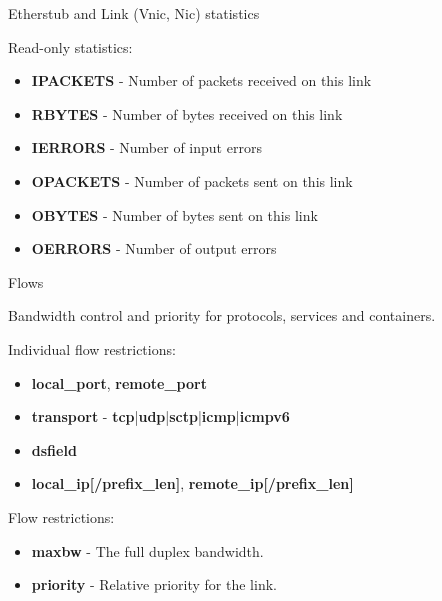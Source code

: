 \documentclass{beamer}
\begin{document}
		\begin{frame}{Etherstub and Link (Vnic, Nic) statistics }

			Read-only statistics:
			
			\begin{itemize}

				\item \textbf{IPACKETS} - Number of packets received on this link
				\item \textbf{RBYTES} - Number of bytes received on this link
				\item \textbf{IERRORS} - Number of input errors
				\item \textbf{OPACKETS} - Number of packets sent on this link
				\item \textbf{OBYTES} - Number of bytes sent on this link
				\item \textbf{OERRORS} - Number of output errors
			
			\end{itemize}

		\end{frame}


		\begin{frame}{Flows}

			Bandwidth control and priority for protocols, services and containers.

			\medskip

			Individual flow restrictions:

			\begin{itemize}
				\item \textbf{local\_port}, \textbf{remote\_port}
				\item \textbf{transport} - \textbf{tcp}|\textbf{udp}|\textbf{sctp}|\textbf{icmp}|\textbf{icmpv6}
				\item \textbf{dsfield}
				\item \textbf{local\_ip[/prefix\_len]}, \textbf{remote\_ip[/prefix\_len]}
			\end{itemize}

			\medskip

			Flow restrictions:

			\begin{itemize}
				\item \textbf{maxbw} - The full duplex bandwidth.
				\item \textbf{priority} - Relative priority for the link.
			\end{itemize}

		\end{frame}
\end{document}
